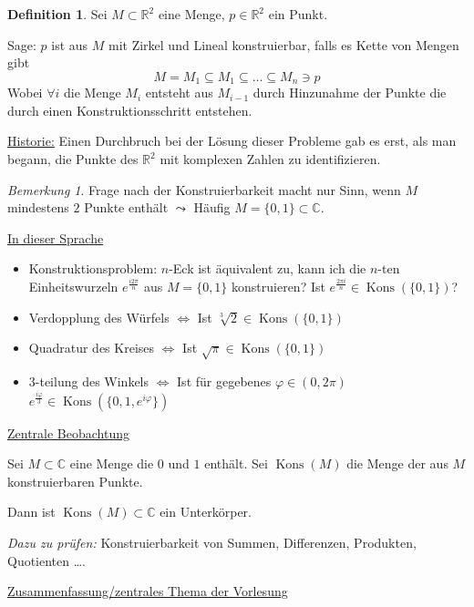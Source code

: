 \documentclass[12pt,parskip=full]{scrartcl}
\newcommand{\setR}{\mathbb{R}}
\newcommand{\setC}{\mathbb{C}}
\newcommand{\heading}{\underline}
\DeclareMathOperator{\Kons}{Kons}
\theoremstyle{definition}
\newtheorem{definition}[theorem]{Definition}
\theoremstyle{remark}
\newtheorem*{remark}{Bemerkung}
\begin{document}
	\begin{definition}
		Sei $M \subset \setR^2$ eine Menge, $p \in \setR^2$ ein Punkt.
		
		Sage: $p$ ist aus $M$ mit Zirkel und Lineal konstruierbar, falls es Kette von Mengen gibt
		\begin{equation*}
			M = M_1 \subseteq M_1 \subseteq \dots \subseteq M_n \ni p
		\end{equation*}
		Wobei $\forall i$ die Menge $M_i$ entsteht aus $M_{i-1}$ durch Hinzunahme der Punkte die durch einen Konstruktionsschritt entstehen.
	\end{definition}

	\heading{Historie:} Einen Durchbruch bei der Lösung dieser Probleme gab es erst, als man begann, die Punkte des $\setR^2$ mit komplexen Zahlen zu identifizieren.
	
	\begin{remark}
		Frage nach der Konstruierbarkeit macht nur Sinn, wenn $M$ mindestens $2$ Punkte enthält $\leadsto$ Häufig $M = \{0,1\} \subset \setC$.
	\end{remark}

	\heading{In dieser Sprache}
	\begin{itemize}
		\item Konstruktionsproblem: $n$-Eck ist äquivalent zu, kann ich die $n$-ten Einheitswurzeln $e^{\frac{i 2 \pi}{n}}$ aus $M = \{ 0,1 \}$ konstruieren?
		Ist $e^{\frac{2\pi i}{n}} \in \Kons(\{0,1\})$?
		\item Verdopplung des Würfels $\Leftrightarrow$ Ist $\sqrt[3]{2} \in \Kons(\{0,1\})$
		\item Quadratur des Kreises $\Leftrightarrow$ Ist $\sqrt{\pi} \in \Kons(\{0,1\})$
		\item $3$-teilung des Winkels $\Leftrightarrow$ Ist für gegebenes $\varphi \in (0,2\pi)$ $e^{\frac{i \varphi}{3}} \in \Kons(\{ 0, 1, e^{i \varphi} \})$
	\end{itemize}

	\heading{Zentrale Beobachtung}
	
	Sei $M \subset \setC$ eine Menge die $0$ und $1$ enthält. Sei $\Kons(M)$ die Menge der aus $M$ konstruierbaren Punkte.
	
	Dann ist $\Kons(M) \subset \setC$ ein Unterkörper.
	
	\textit{Dazu zu prüfen:} Konstruierbarkeit von Summen, Differenzen, Produkten, Quotienten \dots.
	
	\heading{Zusammenfassung/zentrales Thema der Vorlesung}
	
\end{document}
